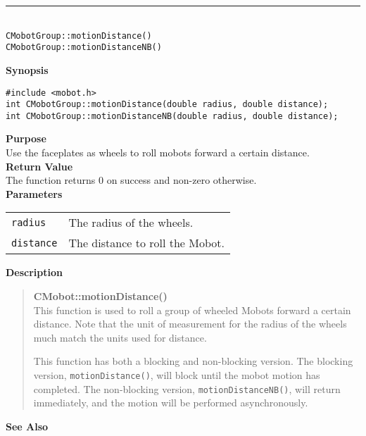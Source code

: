\noindent
\vspace{5pt}
\rule{4.5in}{0.015in}\\
\noindent
{\LARGE \texttt{CMobotGroup::motionDistance()}}\\
{\LARGE \texttt{CMobotGroup::motionDistanceNB()}}\\
{}

\noindent
{\bf Synopsis}
\vspace{-8pt}
\begin{verbatim}
#include <mobot.h>
int CMobotGroup::motionDistance(double radius, double distance);
int CMobotGroup::motionDistanceNB(double radius, double distance);
\end{verbatim}

\noindent
{\bf Purpose}\\
Use the faceplates as wheels to roll mobots forward a certain distance.\\

\noindent
{\bf Return Value}\\
The function returns 0 on success and non-zero otherwise.\\

\noindent
{\bf Parameters}\\
\vspace{-0.1in}
\begin{description}
\item               
\begin{tabular}{p{15 mm}p{145 mm}}
\texttt{radius} & The radius of the wheels.\\
\texttt{distance} & The distance to roll the Mobot.\\
\end{tabular}
\end{description}

\noindent
{\bf Description}\\
\vspace{-12pt}
\begin{quote}
{\bf CMobot::motionDistance()}\\
This function is used to roll a group of wheeled Mobots forward a certain distance. 
Note that the unit of measurement for the radius of the wheels much match the units 
used for distance.

This function has both a blocking and non-blocking version.
The blocking version, \texttt{motionDistance()}, will block until the
mobot motion has completed. The non-blocking version, \texttt{motionDistanceNB()},
will return immediately, and the motion will be performed asynchronously.\\
\end{quote}

\noindent
{\bf See Also}\\

